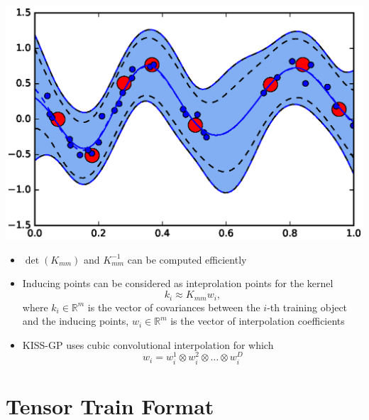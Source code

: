 \documentclass[a0,portrait]{a0poster}
\newcommand{\R}{\mathbb{R}}
\begin{document}
\begin{multicols}{2}
\begin{itemize}
\end{itemize}
\begin{minipage}[b]{0.45\linewidth}

  \begin{center}
    \includegraphics[width=1.\linewidth]{pics/gps/1d_gp_ind_inputs.eps}
  \end{center}

  \vspace{-1cm}
\end{minipage}
\begin{minipage}[b]{0.5\linewidth}
  \begin{center}
    \centering
    \scalebox{1.25}{
      
    }
  \end{center}
\end{minipage}
    
    \begin{itemize}
      \item $\det(K_{mm})$ and $K_{mm}^{-1}$ can be computed efficiently
      \item Inducing points can be considered as inteprolation points for the
        kernel
        \[
          k_i \approx K_{mm} w_i,
        \]
      where $k_i \in \R^m$ is the vector of covariances between the $i$-th training
      object and the inducing points, $w_i\in \R^{m}$ is the vector of interpolation coefficients

      \item KISS-GP uses cubic convolutional interpolation for which 
        \[
          w_i = w_i^1 \otimes w_i^2 \otimes \ldots \otimes w_i^D
        \]
\end{itemize}

\section*{\LARGE \color{NavyBlue} Tensor Train Format}


\end{multicols}
\end{document}
